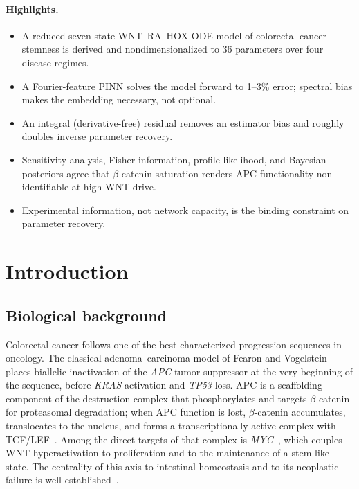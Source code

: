 \documentclass[11pt]{article}
\newcommand{\bcat}{$\beta$-\hspace{0pt}catenin}
\begin{document}
\paragraph{Highlights.}
\begin{itemize}\setlength{\itemsep}{0pt}
\item A reduced seven-state WNT--RA--HOX ODE model of colorectal cancer
stemness is derived and nondimensionalized to 36 parameters over four disease
regimes.
\item A Fourier-feature PINN solves the model forward to 1--3\% error;
spectral bias makes the embedding necessary, not optional.
\item An integral (derivative-free) residual removes an estimator bias and
roughly doubles inverse parameter recovery.
\item Sensitivity analysis, Fisher information, profile likelihood, and
Bayesian posteriors agree that \bcat{} saturation renders APC functionality
non-identifiable at high WNT drive.
\item Experimental information, not network capacity, is the binding
constraint on parameter recovery.
\end{itemize}

\tableofcontents

\newpage

\section{Introduction}
\label{sec:intro}

\subsection{Biological background}

Colorectal cancer follows one of the best-characterized progression sequences
in oncology. The classical adenoma--carcinoma model of Fearon and
Vogelstein~\citep{fearon1990genetic} places biallelic inactivation of the
\emph{APC} tumor suppressor at the very beginning of the sequence, before
\emph{KRAS} activation and \emph{TP53} loss. APC is a scaffolding component of
the destruction complex that phosphorylates and targets \bcat{} for
proteasomal degradation; when APC function is lost, \bcat{} accumulates,
translocates to the nucleus, and forms a transcriptionally active complex with
TCF/LEF~\citep{korinek1997tcf,kinzler1996hereditary}. Among the direct
targets of that complex is \emph{MYC}~\citep{he1998myc}, which
couples WNT hyperactivation to proliferation and to the maintenance of a
stem-like state. The centrality of this axis to intestinal homeostasis and to
its neoplastic failure is well
established~\citep{clevers2012wnt,nusse2017wnt}.
\end{document}

